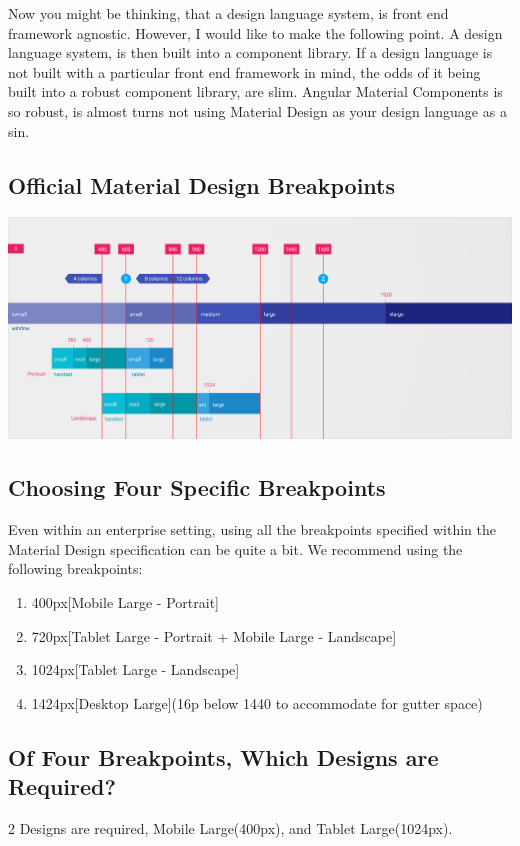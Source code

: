 Now you might be thinking, that a design language system, is front end framework
agnostic. However, I would like to make the following point. A design language
system, is then built into a component library. If a design language is not
built with a particular front end framework in mind, the odds of it being
built into a robust component library, are slim. Angular Material Components is
so robust, is almost turns not using Material Design as your design language as
a sin.

\subsection{ Official Material Design Breakpoints }
\includegraphics[scale=0.10]{pwa/responsive/layout-adaptive-breakpoints}

\subsection{ Choosing Four Specific Breakpoints }
Even within an enterprise setting, using all the breakpoints specified within
the Material Design specification can be quite a bit. We recommend using the
following breakpoints:

\begin{enumerate}
  \item 400px[Mobile Large - Portrait]
  \item 720px[Tablet Large - Portrait + Mobile Large - Landscape]
  \item 1024px[Tablet Large - Landscape]
  \item 1424px[Desktop Large](16p below 1440 to accommodate for gutter space)
\end{enumerate}

\subsection{ Of Four Breakpoints, Which Designs are Required? }
2 Designs are required, Mobile Large(400px), and Tablet Large(1024px).

